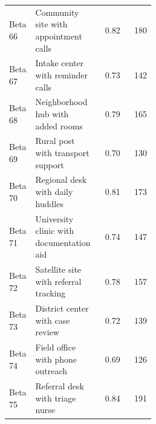 \documentclass[11pt]{article}
\begin{document}
\begin{longtable}{>{\raggedright\arraybackslash}p{0.18\linewidth}%
                  >{\raggedright\arraybackslash}p{0.30\linewidth}%
                  r r}
Beta 66 & Community site with appointment calls & 0.82 & 180\\
Beta 67 & Intake center with reminder calls & 0.73 & 142\\
Beta 68 & Neighborhood hub with added rooms & 0.79 & 165\\
Beta 69 & Rural post with transport support & 0.70 & 130\\
Beta 70 & Regional desk with daily huddles & 0.81 & 173\\
Beta 71 & University clinic with documentation aid & 0.74 & 147\\
Beta 72 & Satellite site with referral tracking & 0.78 & 157\\
Beta 73 & District center with case review & 0.72 & 139\\
Beta 74 & Field office with phone outreach & 0.69 & 126\\
Beta 75 & Referral desk with triage nurse & 0.84 & 191\\
\end{longtable}
\end{document}
